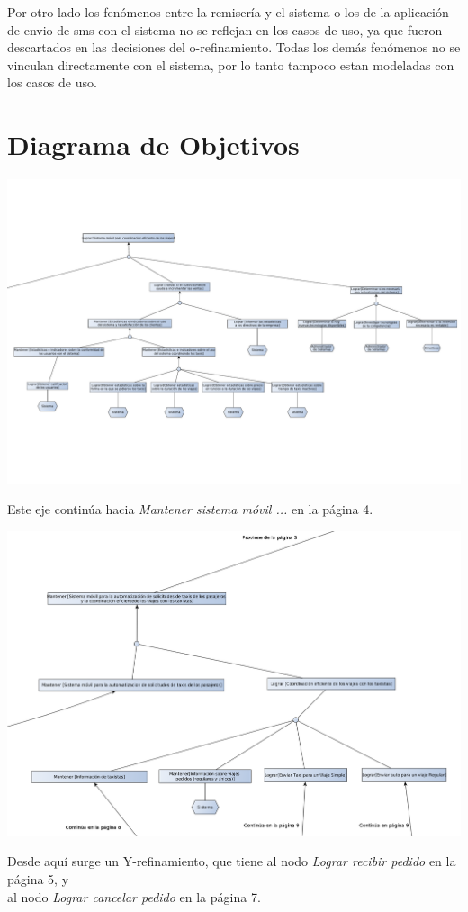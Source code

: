 \documentclass[a4paper]{article}
\begin{document}
Por otro lado los fen\'omenos entre la remiser\'ia y el sistema o los de la aplicaci\'on de envio de sms con el sistema no se reflejan en los casos de uso, ya que fueron descartados en las decisiones del o-refinamiento.
Todas los dem\'as fen\'omenos no se vinculan directamente con el sistema, por lo tanto tampoco estan modeladas con los casos de uso.


\section{Diagrama de Objetivos}

\begin{center}
\includegraphics[width=1.3\textwidth,keepaspectratio,angle=90]{diag_objetivos_partido/diag_objetivos_1.pdf}
\begin{center}
Este eje contin\'ua hacia \textit{Mantener sistema m\'ovil ... } en la p\'agina 4.
\end{center}

\includegraphics[width=1.3\textwidth,keepaspectratio,angle=90]{diag_objetivos_partido/diag_objetivos_2_pag.png}
\begin{center}
Desde aqu\'i surge un Y-refinamiento, que tiene al nodo \textit{Lograr recibir pedido} en la p\'agina 5, y \\
al nodo \textit{Lograr cancelar pedido} en la p\'agina 7.
\end{center}
\newpage


\end{center}
\end{document}
